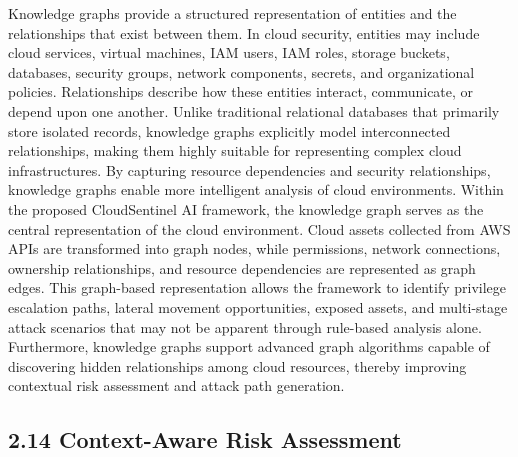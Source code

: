 Knowledge graphs provide a structured representation \cite{hogan2021knowledge} of entities and the relationships that exist between them. In cloud security, entities may include cloud services, virtual machines, IAM users, IAM roles, storage buckets, databases, security groups, network components, secrets, and organizational policies. Relationships describe how these entities interact, communicate, or depend upon one another. Unlike traditional relational databases that primarily store isolated records, knowledge graphs explicitly model interconnected relationships, making them highly suitable for representing complex cloud infrastructures. By capturing resource dependencies and security relationships, knowledge graphs enable more intelligent analysis of cloud environments. Within the proposed CloudSentinel AI framework, the knowledge graph serves as the central representation of the cloud environment. Cloud assets collected from AWS APIs are transformed into graph nodes, while permissions, network connections, ownership relationships, and resource dependencies are represented as graph edges. This graph-based representation allows the framework to identify privilege escalation paths, lateral movement opportunities, exposed assets, and multi-stage attack scenarios that may not be apparent through rule-based analysis alone. Furthermore, knowledge graphs support advanced graph algorithms capable of discovering hidden relationships among cloud resources, thereby improving contextual risk assessment and attack path generation.

\subsection{2.14 Context-Aware Risk Assessment}

